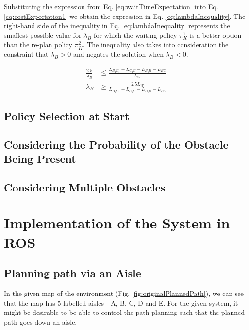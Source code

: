 \documentclass[a4paper,12pt]{article}
\begin{document}
			Substituting the expression from Eq. \ref{eq:waitTimeExpectation} into Eq. \ref{eq:costExpectation1} we obtain the expression in Eq. \ref{eq:lambdaInequality}. The right-hand side of the inequality in Eq. \ref{eq:lambdaInequality} represents the smallest possible value for $\lambda_{B}$ for which the waiting policy $\pi_K^1$ is a better option than the re-plan policy $\pi_K^2$. The inequality also takes into consideration the constraint that $\lambda_{B} > 0$ and negates the solution when $\lambda_{B} < 0$.

			\begin{equation}
				\begin{split}
					\frac{2.5}{\lambda_{B}} & \leq \frac{L_{B_{1}C_{1}} + L_{C_{1}C} - L_{B_{1}B} - L_{BC}}{L_W} \\
					\lambda_{B} & \geq \frac{2.5L_W}{L_{B_{1}C_{1}} + L_{C_{1}C} - L_{B_{1}B} - L_{BC}}
				\end{split}
				\label{eq:lambdaInequality}
			\end{equation}

		\subsection{Policy Selection at Start}

		\subsection{Considering the Probability of the Obstacle Being Present}

		\subsection{Considering Multiple Obstacles}

	
	\section{Implementation of the System in ROS}
	\subsection{Planning path via an Aisle}
	In the given map of the environment (Fig. \ref{fig:originalPlannedPath}), we can see that the map has 5 labelled aisles - A, B, C, D and E. For the given system, it might be desirable to be able to control the path planning such that the planned path goes down an aisle. 
	
\end{document}
